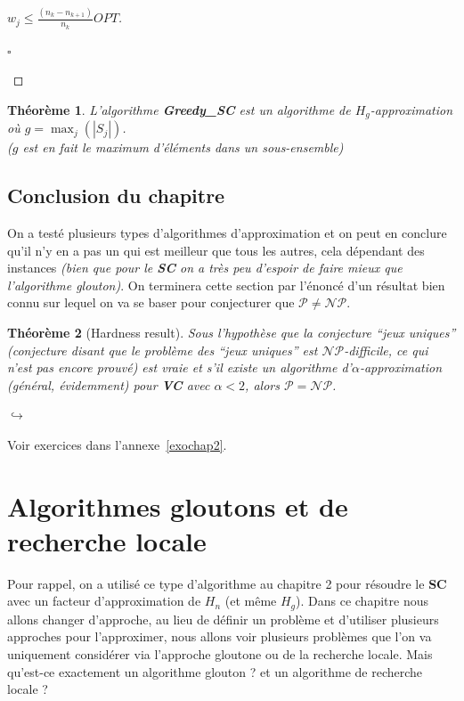 \documentclass{article}
\newcommand{\titre}[1]{\textcolor{title}{#1}}
\newcommand{\cqfd}{\begin{flushright}$\square$\end{flushright}}
\newtheorem{thm}{Th\'eor\`eme}[section]
\newtheorem{proof}{Preuve}[section]
\begin{document}
\begin{sffamily}
\begin{proof}[$w_j \leq \frac{(n_k - n_{k+1})}{n_k}OPT$]
\cqfd
\end{proof}

\begin{thm} L'algorithme \textbf{Greedy\_SC} est un algorithme de $H_g$-approximation où $g = \max_{j}(|S_j|)$. \\($g$ est en fait le 
maximum d'éléments dans un sous-ensemble)
\end{thm}

\subsection{Conclusion du chapitre}

On a testé plusieurs types d'algorithmes d'approximation et on peut en conclure qu'il n'y en a pas un qui est meilleur que tous les 
autres, cela dépendant des instances \textit{(bien que pour le \titre{\textbf{SC}} on a très peu d'espoir de faire mieux que l'algorithme 
glouton)}. On terminera cette section par l'énoncé d'un résultat bien connu sur lequel on va se baser pour conjecturer que $\mathcal{P} 
\neq \mathcal{NP}$.

\begin{thm}[Hardness result] Sous l'hypothèse que la conjecture ``jeux uniques'' (conjecture disant que le problème des ``jeux uniques'' 
est $\mathcal{NP}$-difficile, ce qui n'est pas encore prouvé) est vraie et s'il existe un algorithme d'$\alpha$-approximation (général, 
évidemment) pour \textbf{\titre{VC}} avec $\alpha < 2$, alors $\mathcal{P} = \mathcal{NP}$. \end{thm}

\vspace{22em}
\begin{flushright}
$\hookrightarrow$ \begin{large}Voir exercices dans l'annexe~\ref{exochap2}.\end{large}
\end{flushright}

\newpage

\section{Algorithmes gloutons et de recherche locale}

Pour rappel, on a utilisé ce type d'algorithme au chapitre 2 pour résoudre le \textbf{\titre{SC}} avec un facteur d'approximation de 
$H_n$ (et même $H_g$). Dans ce chapitre nous allons changer d'approche, au lieu de définir un problème et d'utiliser plusieurs approches 
pour l'approximer, nous allons voir plusieurs problèmes que l'on va uniquement considérer via l'approche gloutone ou de la recherche 
locale. Mais qu'est-ce exactement un algorithme glouton ? et un algorithme de recherche locale ?


\end{sffamily}
\end{document}
